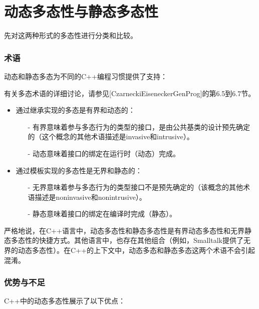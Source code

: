 \section{动态多态性与静态多态性}

先对这两种形式的多态性进行分类和比较。

\subsubsection{术语}

动态和静态多态为不同的C++编程习惯提供了支持：

\begin{notice}
有关多态术语的详细讨论，请参见[CzarneckiEiseneckerGenProg]的第6.5到6.7节。
\end{notice}

\begin{itemize}
\item 
通过继承实现的多态是有界和动态的：

\begin{itemize}
\item[-]
有界意味着参与多态行为的类型的接口，是由公共基类的设计预先确定的（这个概念的其他术语描述是invasive和intrusive）。

\item[-]
动态意味着接口的绑定在运行时（动态）完成。
\end{itemize}

\item 
通过模板实现的多态性是无界和静态的：

\begin{itemize}
\item[-]
无界意味着参与多态行为的类型接口不是预先确定的（该概念的其他术语描述是noninvasive和nonintrusive）。

\item[-]
静态意味着接口的绑定在编译时完成（静态）。
\end{itemize}
\end{itemize}

严格地说，在C++语言中，动态多态性和静态多态性是有界动态多态性和无界静态多态性的快捷方式。其他语言中，也存在其他组合（例如，Smalltalk提供了无界的动态多态性）。在C++的上下文中，动态多态和静态多态这两个术语不会引起混淆。

\subsubsection{优势与不足}

C++中的动态多态性展示了以下优点：

